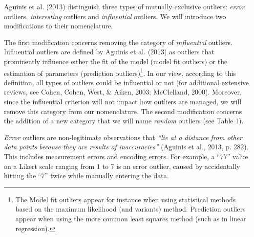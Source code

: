 \documentclass[man,floatsintext]{apa6}
\let\rmarkdownfootnote\footnote%
\def\footnote{\protect\rmarkdownfootnote}
\begin{document}
Aguinis et al. (2013) distinguish three types of mutually exclusive outliers: \emph{error} outliers, \emph{interesting} outliers and \emph{influential} outliers. We will introduce two modifications to their nomenclature.

The first modification concerns removing the category of \emph{influential} outliers. Influential outliers are defined by Aguinis et al. (2013) as outliers that prominently influence either the fit of the model (model fit outliers) or the estimation of parameters (prediction outliers)\footnote{The Model fit outliers appear for instance when using statistical methods based on the maximum likelihood (and variants) method. Prediction outliers appear when using the more common least squares method (such as in linear regression).}. In our view, according to this definition, all types of outliers could be influential or not (for additional extensive reviews, see Cohen, Cohen, West, \& Aiken, 2003; McClelland, 2000). Moreover, since the influential criterion will not impact how outliers are managed, we will remove this category from our nomenclature. The second modification concerns the addition of a new category that we will name \emph{random} outliers (see Table 1).

\emph{Error} outliers are non-legitimate observations that \emph{\enquote{lie at a distance from other data points because they are results of inaccuracies}} (Aguinis et al., 2013, p. 282). This includes measurement errors and encoding errors. For example, a \enquote{77} value on a Likert scale ranging from 1 to 7 is an error outlier, caused by accidentally hitting the \enquote{7} twice while manually entering the data.
\end{document}
